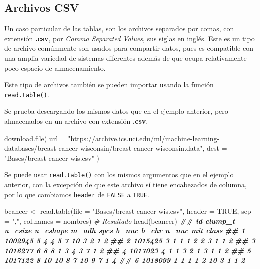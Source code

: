 \documentclass[
]{book}
\newenvironment{Shaded}{\begin{snugshade}}{\end{snugshade}}
\newcommand{\AttributeTok}[1]{\textcolor[rgb]{0.77,0.63,0.00}{#1}}
\newcommand{\CommentTok}[1]{\textcolor[rgb]{0.56,0.35,0.01}{\textit{#1}}}
\newcommand{\ConstantTok}[1]{\textcolor[rgb]{0.00,0.00,0.00}{#1}}
\newcommand{\DocumentationTok}[1]{\textcolor[rgb]{0.56,0.35,0.01}{\textbf{\textit{#1}}}}
\newcommand{\FunctionTok}[1]{\textcolor[rgb]{0.00,0.00,0.00}{#1}}
\newcommand{\NormalTok}[1]{#1}
\newcommand{\OtherTok}[1]{\textcolor[rgb]{0.56,0.35,0.01}{#1}}
\newcommand{\StringTok}[1]{\textcolor[rgb]{0.31,0.60,0.02}{#1}}
\begin{document}
\hypertarget{archivos-csv}{%
\subsection{Archivos CSV}\label{archivos-csv}}

Un caso particular de las tablas, son los archivos separados por comas, con extensión \textbf{.csv}, por \emph{Comma Separated Values}, sus siglas en inglés. Este es un tipo de archivo comúnmente son usados para compartir datos, pues es compatible con una amplia variedad de sistemas diferentes además de que ocupa relativamente poco espacio de almacenamiento.

Este tipo de archivos también se pueden importar usando la función \texttt{read.table()}.

Se prueba descargando los mismos datos que en el ejemplo anterior, pero almacenados en un archivo con extensión \textbf{.csv}.

\begin{Shaded}
\begin{Highlighting}[]
\FunctionTok{download.file}\NormalTok{(}
  \AttributeTok{url =} \StringTok{"https://archive.ics.uci.edu/ml/machine{-}learning{-}databases/breast{-}cancer{-}wisconsin/breast{-}cancer{-}wisconsin.data"}\NormalTok{, }
  \AttributeTok{dest =} \StringTok{"Bases/breast{-}cancer{-}wis.csv"}
\NormalTok{)}
\end{Highlighting}
\end{Shaded}

Se puede usar \texttt{read.table()} con los mismos argumentos que en el ejemplo anterior, con la excepción de que este archivo sí tiene encabezados de columna, por lo que cambiamos \texttt{header} de \texttt{FALSE} a \texttt{TRUE}.

\begin{Shaded}
\begin{Highlighting}[]
\NormalTok{bcancer }\OtherTok{\textless{}{-}} \FunctionTok{read.table}\NormalTok{(}\AttributeTok{file =} \StringTok{"Bases/breast{-}cancer{-}wis.csv"}\NormalTok{, }\AttributeTok{header =} \ConstantTok{TRUE}\NormalTok{, }\AttributeTok{sep =} \StringTok{","}\NormalTok{,}
                      \AttributeTok{col.names =}\NormalTok{ nombres)}
\CommentTok{\# Resultado}
\FunctionTok{head}\NormalTok{(bcancer)}
\DocumentationTok{\#\#        id clump\_t u\_csize u\_cshape m\_adh spcs b\_nuc b\_chr n\_nuc mit class}
\DocumentationTok{\#\# 1 1002945       5       4        4     5    7    10     3     2   1     2}
\DocumentationTok{\#\# 2 1015425       3       1        1     1    2     2     3     1   1     2}
\DocumentationTok{\#\# 3 1016277       6       8        8     1    3     4     3     7   1     2}
\DocumentationTok{\#\# 4 1017023       4       1        1     3    2     1     3     1   1     2}
\DocumentationTok{\#\# 5 1017122       8      10       10     8    7    10     9     7   1     4}
\DocumentationTok{\#\# 6 1018099       1       1        1     1    2    10     3     1   1     2}
\end{Highlighting}
\end{Shaded}
\end{document}
